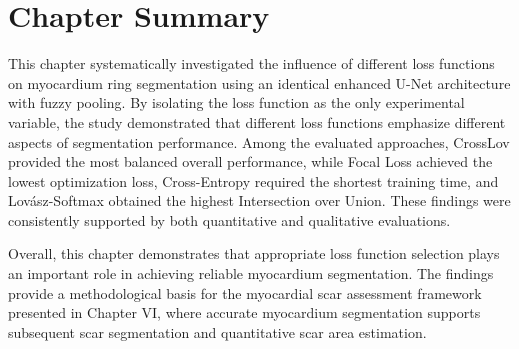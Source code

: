 \section{Chapter Summary}
\label{sec:ch5-summary}  

This chapter systematically investigated the influence of different loss functions on myocardium ring segmentation using an identical enhanced U-Net architecture with fuzzy pooling. By isolating the loss function as the only experimental variable, the study demonstrated that different loss functions emphasize different aspects of segmentation performance. Among the evaluated approaches, CrossLov provided the most balanced overall performance, while Focal Loss achieved the lowest optimization loss, Cross-Entropy required the shortest training time, and Lovász-Softmax obtained the highest Intersection over Union. These findings were consistently supported by both quantitative and qualitative evaluations.

Overall, this chapter demonstrates that appropriate loss function selection plays an important role in achieving reliable myocardium segmentation. The findings provide a methodological basis for the myocardial scar assessment framework presented in Chapter VI, where accurate myocardium segmentation supports subsequent scar segmentation and quantitative scar area estimation.

